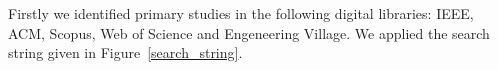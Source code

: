 %

Firstly we identified primary studies in the following digital libraries: IEEE, ACM, Scopus, Web of Science and Engeneering Village. We applied the search string given in Figure~\ref{search_string}. %



